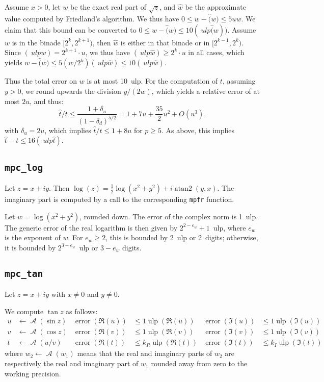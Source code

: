 \documentclass [11pt]{article}
\newcommand {\mpfr}{{\tt mpfr}}
\newcommand {\ulp}[1]{#1~ulp}
\newcommand {\Ulp}{{\operatorname {ulp}}}
\newcommand {\atantwo}{\operatorname {atan2}}
\newcommand{\error}{\operatorname {error}}
\DeclareMathOperator{\A}{\mathcal A}
\renewcommand {\leq}{\leqslant}
\renewcommand {\geq}{\geqslant}
\begin{document}
Assume $x > 0$, let $w$ be the exact real part of
$\sqrt{z}$, and $\hat{w}$ be the approximate value computed by
Friedland's algorithm.
We thus have $0 \leq w - \hat(w) \leq 5 u w$.
We claim that this bound can be converted to
$0 \leq w - \hat(w) \leq 10 \ulp(\hat(w))$.
Assume $w$ is in the binade $[2^k,2^{k+1})$, then $\hat{w}$ is either in that
binade or in $[2^{k-1},2^k)$.
Since $\ulp(w) = 2^{k+1} \cdot u$, we thus have $\ulp(\hat{w}) \geq 2^k \cdot u$ in
all cases, which yields $w - \hat(w) \leq 5 (w/2^k) \ulp(\hat{w}) \leq 10 \ulp(\hat{w})$.

Thus the total error on $w$ is at most \ulp{10}.
For the computation of $t$, assuming $y > 0$, we round upwards the division $y/(2w)$,
which yields a relative error of at most $2u$, and thus:
\[ \hat{t}/t \leq \frac{1 + \delta_u}{(1 - \delta_d)^{5/2}} = 1 + 7u + \frac{35}{2} u^2 + O(u^3), \]
with $\delta_u = 2u$,
which implies $\hat{t}/t \leq 1 + 8u$ for $p \geq 5$.
As above, this implies $\hat{t} - t \leq 16 \ulp(\hat{t})$.

\subsection {\texttt {mpc\_log}}

Let $z = x + i y$. Then $\log (z) = \frac {1}{2} \log (x^2 + y^2) + i \atantwo (y, x)$. The imaginary part is computed by a call to the corresponding {\mpfr} function.

Let $w = \log (x^2 + y^2)$, rounded down. The error of the complex norm is \ulp{1}. The generic error of the real logarithm is then given by \ulp{$2^{2 - e_w} + 1$}, where $e_w$ is the exponent of $w$. For $e_w \geq 2$, this is bounded by \ulp{2} or 2~digits; otherwise, it is bounded by \ulp{$2^{3 - e_w}$} or $3 - e_w$ digits.

\subsection {\texttt {mpc\_tan}}

Let $z = x + i y$ with $x \neq 0$ and $y \neq 0$.

We compute $\tan z$ as follows:
\begin{align*}
u &\leftarrow \A(\sin z) &\error(\Re(u)) &\leq 1 \Ulp(\Re(u))
&\error(\Im(u)) &\leq 1 \Ulp(\Im(u))
\\
v &\leftarrow \A(\cos z) &\error(\Re(v)) &\leq 1 \Ulp(\Re(v))
&\error(\Im(v)) &\leq 1 \Ulp(\Im(v))
\\
t &\leftarrow \A(u/v) &\error(\Re(t)) &\leq k_R \Ulp(\Re(t))
&\error(\Im(t)) &\leq k_I \Ulp(\Im(t))
\end{align*}
where $w_2 \leftarrow \A(w_1)$ means that the real and imaginary parts of
$w_2$ are respectively the real and imaginary part of $w_1$ rounded away from
zero to the working precision.
\end{document}
